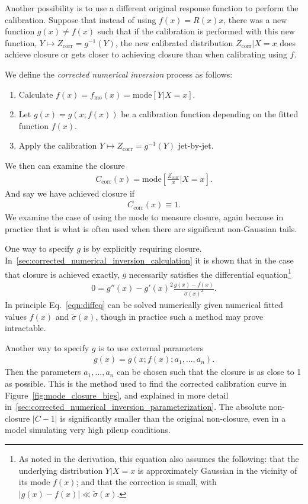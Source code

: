 Another possibility is to use a different original response function to perform the calibration.  Suppose that instead of using $f(x)=R(x)x$, there was a new function $g(x)\ne f(x)$ such that if the calibration is performed with this new function, $Y\mapsto Z_\text{corr}=g^{-1}(Y)$, the new calibrated distribution $Z_\text{corr}|X=x$ does achieve closure or gets closer to achieving closure than when calibrating using $f$.

We define the \emph{corrected numerical inversion} process as follows:
\begin{enumerate}
\item Calculate $f(x)=f_\text{mo}(x)=\text{mode}[Y|X=x]$.
\item Let $g(x) = g(x;f(x))$ be a calibration function depending on the fitted function $f(x)$.
\item Apply the calibration $Y\mapsto Z_\text{corr}=g^{-1}(Y)$ jet-by-jet.
\end{enumerate}
We then can examine the closure
\begin{align}
C_\text{corr}(x) = \text{mode}\left[\frac{Z_\text{corr}}{x}\Big|X=x\right].
\end{align}
And say we have achieved closure if
\begin{align}
C_\text{corr}(x) \equiv 1.
\end{align}
We examine the case of using the mode to measure closure, again because in practice that is what is often used when there are significant non-Gaussian tails. 

One way to specify $g$ is by explicitly requiring closure. In~\ref{sec:corrected_numerical_inversion_calculation} it is shown that in the case that closure is achieved exactly, $g$ necessarily satisfies the differential equation\footnote{As noted in the derivation, this equation also assumes the following: that the underlying distribution $Y|X=x$ is approximately Gaussian in the vicinity of its mode $f(x)$; and that the correction is small, with $|g(x)-f(x)|\ll \tilde{\sigma}(x)$.}
\begin{align}
0=g''(x)-g'(x)^2\frac{g(x)-f(x)}{\tilde{\sigma}(x)^2}.
\label{eqn:diffeq}
\end{align}
In principle Eq.~\ref{eqn:diffeq} can be solved numerically given numerical fitted values $f(x)$ and $\tilde{\sigma}(x)$, though in practice such a method may prove intractable.

Another way to specify $g$ is to use external parameters
\begin{align}
g(x) = g(x;f(x);a_1,...,a_n).
\end{align}
Then the parameters $a_1,...,a_n$ can be chosen such that the closure is as close to 1 as possible. This is the method used to find the corrected calibration curve in Figure~\ref{fig:mode_closure_bigs}, and explained in more detail in~\ref{sec:corrected_numerical_inversion_parameterization}. The absolute non-closure $|C-1|$ is significantly smaller than the original non-closure, even in a model simulating very high pileup conditions.

